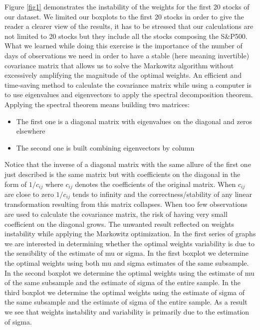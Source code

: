 Figure \ref{fig1} demonstrates the instability of the weights for the first 20 stocks of our dataset. We limited our boxplots to the first 20 stocks in order to give the reader a clearer view of the results, it has to be stressed that our calculations are not limited to 20 stocks but they include all the stocks composing the S\&P500. 
What we learned while doing this exercise is the importance of the number of days of observations we need in order to have a stable (here meaning invertible) covariance matrix that allows us to solve the Markowitz algorithm without excessively amplifying the magnitude of the optimal weights. An efficient and time-saving method to calculate the covariance matrix while using a computer is to use eigenvalues and eigenvectors to apply the spectral decomposition theorem. Applying the spectral theorem means building two matrices:
\begin{itemize}
\item	The first one is a diagonal matrix with eigenvalues on the diagonal and zeros elsewhere
\item The second one is built combining eigenvectors by column
\end{itemize}
Notice that the inverse of a diagonal matrix with the same allure of the first one just described is the same matrix but with coefficients on the diagonal in the form of $1/c_{ij}$ where $c_{ij}$ denotes the coefficients of the original matrix. When $c_{ij}$ are close to zero $1/c_{ij}$  tends to infinity and the correctness/stability of any linear transformation resulting from this matrix collapses.
When too few observations are used to calculate the covariance matrix, the risk of having very small coefficient on the diagonal grows. The unwanted result reflected on weights instability while applying the Markowitz optimization.
In the first series of graphs we are interested in determining whether the optimal weights variability is due to the sensibility of the estimate of mu or sigma.
In the first boxplot we determine the optimal weights using both mu and sigma estimates of the same subsample.
In the second boxplot we determine the optimal weights using the estimate of mu of the same subsample and the estimate of sigma of the entire sample.
In the third boxplot we determine the optimal weights using the estimate of sigma of the same subsample and the estimate of sigma of the entire sample.
As a result we see that weights instability and variability is primarily due to the estimation of sigma.


